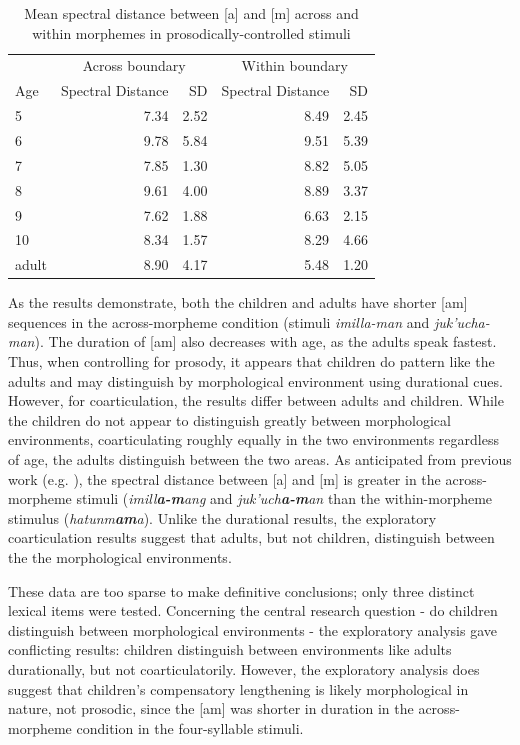 \documentclass[a4paper,man,floatsintext,natbib,donotrepeattitle, apacite]{apa6}
\begin{document}
 \begin{table}[H]
\caption{\label{tab:4syll-table-coartic}Mean spectral distance between [a] and [m] across and within morphemes in prosodically-controlled stimuli}
\centering
\begin{tabular}[t]{lrrrr}
\toprule
\multicolumn{1}{c}{ } & \multicolumn{2}{c}{Across boundary} & \multicolumn{2}{c}{Within boundary} \\
\cmidrule(l{3pt}r{3pt}){2-3} \cmidrule(l{3pt}r{3pt}){4-5}
Age & Spectral Distance  & SD  & Spectral Distance & SD\\
\midrule
 5 & 7.34 & 2.52 & 8.49 & 2.45 \\
 6 &  9.78 & 5.84 & 9.51 & 5.39 \\
 7 & 7.85 & 1.30 & 8.82 & 5.05 \\
 8 & 9.61 & 4.00 & 8.89 & 3.37 \\
 9 & 7.62 & 1.88 & 6.63 & 2.15 \\
 10 &  8.34 & 1.57 & 8.29 & 4.66\\
adult & 8.90 & 4.17 & 5.48 & 1.20 \\
\bottomrule
\end{tabular}
\end{table}


 
As the results demonstrate, both the children and adults have shorter [am] sequences in the across-morpheme condition (stimuli \textit{imilla-man} and \textit{juk'ucha-man}). The duration of [am] also decreases with age, as the adults speak fastest. Thus, when controlling for prosody, it appears that children do pattern like the adults and may distinguish by morphological environment using durational cues. However, for coarticulation, the results differ between adults and children. While the children do not appear to distinguish greatly between morphological environments, coarticulating roughly equally in the two environments regardless of age, the adults distinguish between the two areas. As anticipated from previous work (e.g. \citealt{choEffectsMorphemeBoundaries2001}), the spectral distance between [a] and [m] is greater in the across-morpheme stimuli (\textit{imill\textbf{a-m}ang} and \textit{juk'uch\textbf{a-m}an} than the within-morpheme stimulus (\textit{hatunm\textbf{am}a}). Unlike the durational results, the exploratory coarticulation results suggest that adults, but not children, distinguish between the the morphological environments. 

These data are too sparse to make definitive conclusions; only three distinct lexical items were tested. Concerning the central research question - do children distinguish between morphological environments - the exploratory analysis gave conflicting results: children distinguish between environments like adults durationally, but not coarticulatorily. However, the exploratory analysis does suggest that children's compensatory lengthening is likely morphological in nature, not prosodic, since the [am] was shorter in duration in the across-morpheme condition in the four-syllable stimuli. 
 
\end{document}

